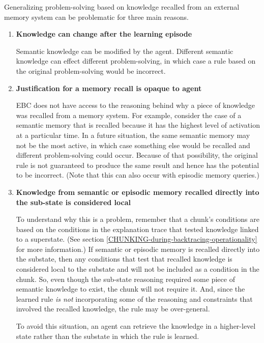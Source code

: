 Generalizing problem-solving based on knowledge recalled from an external memory system can be problematic for three main reasons.

\begin{enumerate}
	\item \textbf{Knowledge can change after the learning episode} \hfill
	
	Semantic knowledge can be modified by the agent.  Different semantic knowledge can effect different problem-solving, in which case a rule based on the original problem-solving would be incorrect. 

	\item \textbf{Justification for a memory recall is opaque to agent} \hfill 
	
	EBC does not have access to the reasoning behind why a piece of knowledge was recalled from a memory system.  For example, consider the case of a semantic memory that is recalled because it has the highest level of activation at a particular time.  In a future situation, the same semantic memory may not be the most active, in which case something else would be recalled and different problem-solving could occur.  Because of that possibility, the original rule is not guaranteed to produce the same result and hence has the potential to be incorrect.  (Note that this can also occur with episodic memory queries.)

	\item \textbf{Knowledge from semantic or episodic memory recalled directly into the sub-state is considered local} \hfill
	
	To understand why this is a problem, remember that a chunk's conditions are based on the conditions in the explanation trace that tested knowledge linked to a superstate.  (See section \ref{CHUNKING-during-backtracing-operationality} for more information.) If semantic or episodic memory is recalled directly into the substate, then any conditions that test that recalled knowledge is considered local to the substate and will not be included as a condition in the chunk.  So, even though the sub-state reasoning required some piece of semantic knowledge to exist, the chunk will not require it.  And, since the learned rule \textit{is not} incorporating some of the reasoning and constraints that involved the recalled knowledge, the rule may be over-general.

	To avoid this situation, an agent can retrieve the knowledge in a higher-level state rather than the substate in which the rule is learned.
\end{enumerate}

